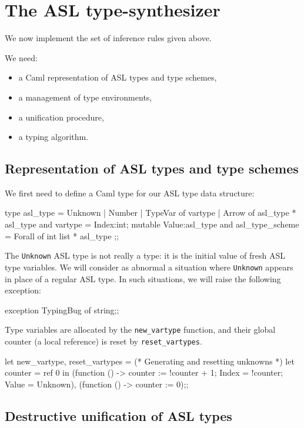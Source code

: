 \section{The ASL type-synthesizer}
%

We now implement the set of inference rules given above.

We need:
\begin{itemize}
\item a Caml representation of ASL types and type schemes,
\item a management of type environments,
\item a unification procedure,
\item a typing algorithm.
\end{itemize}

\subsection{Representation of ASL types and type schemes}
%

We first need to
define a Caml type for our ASL type data structure:
\begin{caml_example}
type asl_type = Unknown
              | Number
              | TypeVar of vartype
              | Arrow of asl_type * asl_type
and vartype = {Index:int; mutable Value:asl_type}
and asl_type_scheme = Forall of int list * asl_type ;;
\end{caml_example}
The {\tt Unknown} ASL type is not really a type: it is the initial value of
fresh ASL type variables. We will consider as abnormal a situation where
{\tt Unknown} appears in place of a regular ASL type. In such situations, we
will raise the following exception:
%
\begin{caml_example}
exception TypingBug of string;;
\end{caml_example}
Type variables are allocated by the \verb"new_vartype" function, and their
global counter (a local reference) is reset by \verb"reset_vartypes".
\begin{caml_example}
let new_vartype, reset_vartypes =
(* Generating and resetting unknowns *)
    let counter = ref 0
    in (function () -> counter := !counter + 1;
                       {Index = !counter; Value = Unknown}),
       (function () -> counter := 0);;
\end{caml_example}

\subsection{Destructive unification of ASL types}
%

